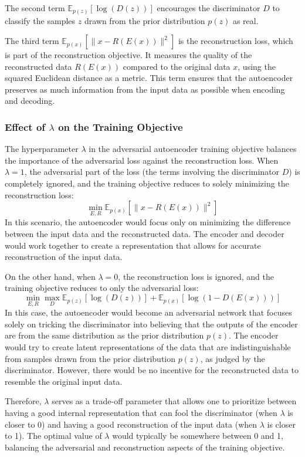 \documentclass[a4paper]{article}
\begin{document}
The second term $\mathbb{E}_{p(z)}[\log(D(z))]$ encourages the discriminator $D$ to classify the samples $z$ drawn
from the prior distribution $p(z)$ as real.

The third term $\mathbb{E}_{p(x)}[\|x - R(E(x))\|^2]$ is the reconstruction loss, which is part of the reconstruction
objective. It measures the quality of the reconstructed data $R(E(x))$ compared to the original data $x$, using the squared
Euclidean distance as a metric. This term ensures that the autoencoder preserves as much information from the input data as
possible when encoding and decoding.

\subsubsection{Effect of $\lambda$ on the Training Objective}
The hyperparameter $\lambda$ in the adversarial autoencoder training objective balances the importance of the adversarial
loss against the reconstruction loss.
When $\lambda = 1$, the adversarial part of the loss (the terms involving the discriminator $D$) is completely ignored, and
the training objective reduces to solely minimizing the reconstruction loss:
$$ \min_{E, R} \mathbb{E}_{p(x)}\left[\|x - R(E(x))\|^2\right] $$
In this scenario, the autoencoder would focus only on minimizing the difference between the input data and the reconstructed
data. The encoder and decoder would work together to create a representation that allows for accurate reconstruction of the
input data.

On the other hand, when $\lambda = 0$, the reconstruction loss is ignored, and the training objective reduces to only the
adversarial loss:
$$ \min_{E, R} \max_D \mathbb{E}_{p(z)}[\log(D(z))] + \mathbb{E}_{p(x)}[\log(1 - D(E(x)))] $$
In this case, the autoencoder would become an adversarial network that focuses solely on tricking the discriminator into
believing that the outputs of the encoder are from the same distribution as the prior distribution $p(z)$. The encoder would
try to create latent representations of the data that are indistinguishable from samples drawn from the prior distribution
$p(z)$, as judged by the discriminator. However, there would be no incentive for the reconstructed data to resemble the
original input data.

Therefore, $\lambda$ serves as a trade-off parameter that allows one to prioritize between having a good internal
representation that can fool the discriminator (when $\lambda$ is closer to 0) and having a good reconstruction of the input
data (when $\lambda$ is closer to 1). The optimal value of $\lambda$ would typically be somewhere between 0 and 1, balancing
the adversarial and reconstruction aspects of the training objective.
\end{document}
